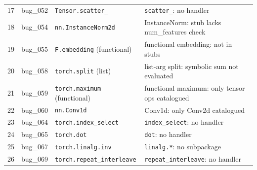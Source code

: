 \begin{table}[h]
\begin{tabular}{r l l l}
17 & bug\_052 & \texttt{Tensor.scatter\_}                  & \texttt{scatter\_}: no handler \\
18 & bug\_054 & \texttt{nn.InstanceNorm2d}                 & InstanceNorm: stub lacks num\_features check \\
19 & bug\_055 & \texttt{F.embedding} (functional)          & functional embedding: not in stubs \\
20 & bug\_058 & \texttt{torch.split} (list)                & list-arg split: symbolic sum not evaluated \\
21 & bug\_059 & \texttt{torch.maximum} (functional)        & functional maximum: only tensor ops catalogued \\
22 & bug\_060 & \texttt{nn.Conv1d}                         & Conv1d: only Conv2d catalogued \\
23 & bug\_064 & \texttt{torch.index\_select}               & \texttt{index\_select}: no handler \\
24 & bug\_065 & \texttt{torch.dot}                         & \texttt{dot}: no handler \\
25 & bug\_067 & \texttt{torch.linalg.inv}                  & \texttt{linalg.*}: no subpackage \\
26 & bug\_069 & \texttt{torch.repeat\_interleave}          & \texttt{repeat\_interleave}: no handler \\
\bottomrule
\end{tabular}
\end{table}
